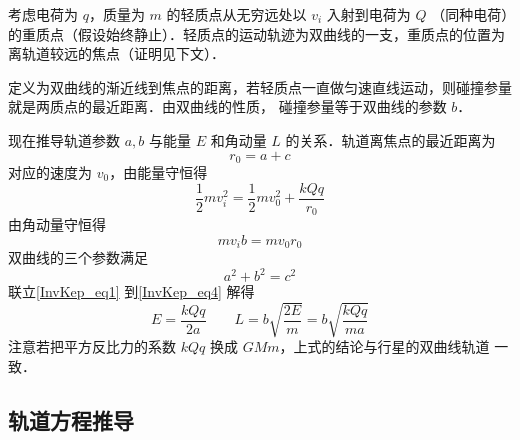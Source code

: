 

考虑电荷为 $q$，质量为 $m$ 的轻质点从无穷远处以 $v_i$ 入射到电荷为 $Q$ （同种电荷）的重质点（假设始终静止）．轻质点的运动轨迹为双曲线的一支，重质点的位置为离轨道较远的焦点（证明见下文）．

定义为双曲线的渐近线到焦点的距离，若轻质点一直做匀速直线运动，则碰撞参量就是两质点的最近距离．由双曲线的性质，%
碰撞参量等于双曲线的参数 $b$．

现在推导轨道参数 $a,b$ 与能量 $E$ 和角动量 $L$ 的关系．轨道离焦点的最近距离为
\begin{equation}\label{InvKep_eq1}
r_0 = a+c
\end{equation}
对应的速度为 $v_0$，由能量守恒得
\begin{equation}
\frac{1}{2} mv_i^2 = \frac{1}{2} mv_0^2 + \frac{kQq}{r_0}
\end{equation}
由角动量守恒得
\begin{equation}
m v_i b = m v_0 r_0
\end{equation}
双曲线的三个参数满足
\begin{equation}\label{InvKep_eq4}
a^2+b^2=c^2
\end{equation}
联立\autoref{InvKep_eq1} 到\autoref{InvKep_eq4} 解得
\begin{equation}
E = \frac{kQq}{2a} \qquad L = b\sqrt{\frac{2E}{m}} =b\sqrt{\frac{kQq}{ma}}
\end{equation}
注意若把平方反比力的系数 $kQq$ 换成 $GMm$，上式的结论与行星的双曲线轨道%
一致．

\subsection{轨道方程推导}
